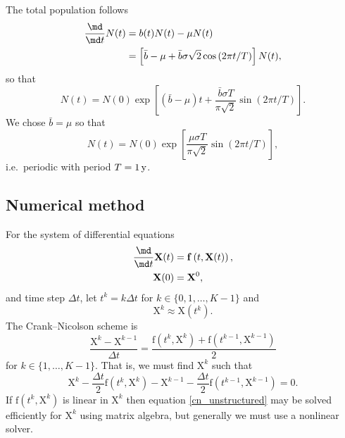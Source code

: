 \documentclass{jpmarticle}
\renewcommand{\vec}[1]{\boldsymbol{\mathrm{#1}}}
\begin{document}
The total population follows
\begin{equation}
  \begin{split}
    \frac{\md}{\md t} N(t)
    &= b(t) N(t) - \mu N(t)
    \\
    &= \left[
      \bar{b} - \mu
      + \bar{b} \sigma \sqrt{2} \cos\left(2 \pi t / T\right)
    \right]
    N(t),
  \end{split}
\end{equation}
so that
\begin{equation}
  N(t) = N(0) \exp\left[
    \left(\bar{b} - \mu\right) t
    + \frac{\bar{b} \sigma T}{\pi \sqrt{2}}
    \sin\left(2 \pi t / T\right)
  \right].
\end{equation}
We chose $\bar{b} = \mu$ so that
\begin{equation}
  N(t) = N(0) \exp\left[
    \frac{\mu \sigma T}{\pi \sqrt{2}}
    \sin\left(2 \pi t / T\right)
  \right],
\end{equation}
i.e.~periodic with period $T = \unit[1]{y}$.


\subsection{Numerical method}

For the system of differential equations
\begin{equation}
  \begin{split}
    \frac{\md}{\md t} \vec{X}(t)
    &= \vec{f}\left(t, \vec{X}(t)\right),
    \\
    \vec{X}(0) &= \vec{X}^0,
  \end{split}
\end{equation}
and time step $\Delta t$, let $t^k = k \Delta t$ for
$k \in \{0, 1, \ldots, K - 1\}$ and
\begin{equation}
  \vec{X}^k \approx \vec{X}(t^k).
\end{equation}
The Crank--Nicolson scheme is
\begin{equation}
  \frac{\vec{X}^k - \vec{X}^{k - 1}}{\Delta t}
  = \frac{
    \vec{f}\left(t^k, \vec{X}^k\right)
    + \vec{f}\left(t^{k - 1}, \vec{X}^{k - 1}\right)
  }{2}
\end{equation}
for $k \in \{1, \ldots, K - 1\}$.
That is, we must find $\vec{X}^k$ such that
\begin{equation}
  \label{cn_unstructured}
  \vec{X}^k
  - \frac{\Delta t}{2}
  \vec{f}\left(t^k, \vec{X}^k\right)
  - \vec{X}^{k - 1}
  - \frac{\Delta t}{2}
  \vec{f}\left(t^{k - 1}, \vec{X}^{k - 1}\right)
  = \vec{0}.
\end{equation}
If $\vec{f}\left(t^k, \vec{X}^k\right)$ is linear in $\vec{X}^k$
then equation \eqref{cn_unstructured} may be solved efficiently for
$\vec{X}^k$ using matrix algebra, but generally we must use a
nonlinear solver.
\end{document}
